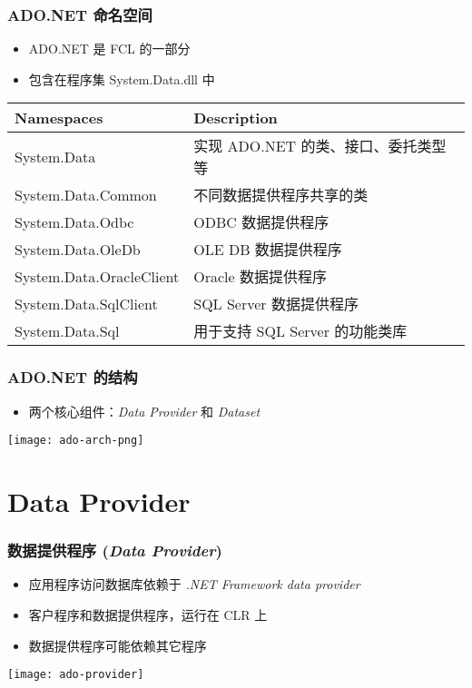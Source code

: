 \begin{frame}
\frametitle{ADO.NET 命名空间}

\begin{itemize}
\item ADO.NET 是 FCL 的一部分
\item 包含在程序集 System.Data.dll 中
\end{itemize}

\begin{tabular}{l|l}
\hline
\textbf{Namespaces} & \textbf{Description} \\
\hline
\small System.Data & 实现 ADO.NET 的类、接口、委托类型等 \\
\small System.Data.Common & 不同数据提供程序共享的类 \\
\small System.Data.Odbc & ODBC 数据提供程序 \\
\small System.Data.OleDb & OLE DB 数据提供程序 \\
\small System.Data.OracleClient & Oracle 数据提供程序 \\
\small System.Data.SqlClient & SQL Server 数据提供程序 \\
\small System.Data.Sql & 用于支持 SQL Server 的功能类库 \\
\hline
\end{tabular}
\end{frame}

\begin{frame}
\frametitle{ADO.NET 的结构}

\begin{itemize}
\item 两个核心组件：\textit{Data Provider} 和 \textit{Dataset}
\end{itemize}

\begin{center}
  \texttt{[image: ado-arch-png]}
\end{center}

\end{frame}

\section{Data Provider}

\begin{frame}
\frametitle{数据提供程序 (\textit{Data Provider})}
\begin{itemize}
\item 应用程序访问数据库依赖于 \textit{.NET Framework data provider}
\item 客户程序和数据提供程序，运行在 CLR 上
\item 数据提供程序可能依赖其它程序
\end{itemize}
\begin{center}
  \texttt{[image: ado-provider]}
\end{center}
\end{frame}

